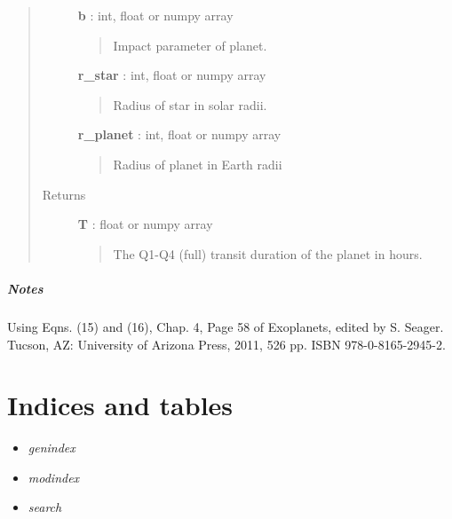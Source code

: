 \documentclass[letterpaper,10pt,english]{sphinxmanual}
\begin{document}
\begin{fulllineitems}
\begin{quote}
\begin{description}
\textbf{b} : int, float or numpy array
\begin{quote}

Impact parameter of planet.
\end{quote}

\textbf{r\_star} : int, float or numpy array
\begin{quote}

Radius of star in solar radii.
\end{quote}

\textbf{r\_planet} : int, float or numpy array
\begin{quote}

Radius of planet in Earth radii
\end{quote}

\item[{Returns}] \leavevmode
\textbf{T} : float or numpy array
\begin{quote}

The Q1-Q4 (full) transit duration of the planet in hours.
\end{quote}

\end{description}\end{quote}
\paragraph{Notes}

Using Eqns. (15) and (16), Chap. 4, Page  58 of Exoplanets, edited by S.
Seager. Tucson, AZ: University of Arizona Press, 2011, 526 pp.
ISBN 978-0-8165-2945-2.

\end{fulllineitems}



\chapter{Indices and tables}
\label{index:indices-and-tables}\label{index:welcome-to-simple-s-documentation}\begin{itemize}
\item {} 
\emph{genindex}

\item {} 
\emph{modindex}

\item {} 
\emph{search}

\end{itemize}



\renewcommand{\indexname}{Index}
\printindex
\end{document}
